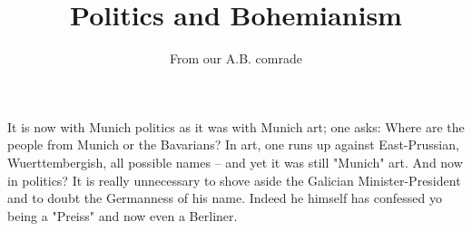 \title{Politics and Bohemianism}
\author{From our A.B. comrade}



It is now with Munich politics as it was with Munich art; one asks: Where are the people from Munich or the Bavarians? In art, one runs up against East-Prussian, Wuerttembergish, all possible names -- and yet it was still "Munich" art. And now in politics? It is really unnecessary to shove aside the Galician Minister-President and to doubt the Germanness of his name. Indeed he himself has confessed yo being a "Preiss" and now even a Berliner.
